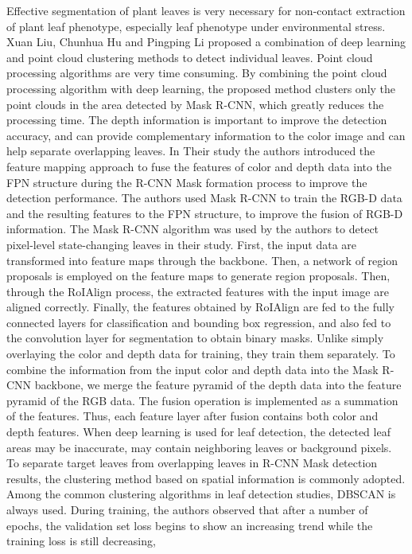 Effective segmentation of plant leaves is very necessary for non-contact extraction of plant leaf phenotype, especially leaf phenotype under environmental stress.
Xuan Liu, Chunhua Hu and Pingping Li\cite{LIU2020105753} proposed a combination of deep learning and point cloud clustering methods to detect individual leaves. Point cloud processing algorithms are very time
consuming. By combining the point cloud processing algorithm with deep learning, the proposed method clusters only the point clouds in the area detected by Mask R-CNN\cite{he2017mask},
which greatly reduces the processing time. The depth information is important to improve the detection accuracy, and can provide complementary information to the color
image and can help separate overlapping leaves. In Their study the authors introduced the feature mapping approach to fuse the features of color and depth data into the FPN\cite{lin2017feature}
structure during the R-CNN Mask formation process to improve the detection performance. The authors used Mask R-CNN to train the RGB-D data and the resulting features
to the FPN structure, to improve the fusion of RGB-D information. The Mask R-CNN algorithm was used by the authors to detect pixel-level state-changing leaves in their
study. First, the input data are transformed into feature maps through the backbone. Then, a network of region proposals is employed on the feature maps to generate
region proposals. Then, through the RoIAlign process, the extracted features with the input image are aligned correctly. Finally, the features obtained by RoIAlign are
fed to the fully connected layers for classification and bounding box regression, and also fed to the convolution layer for segmentation to obtain binary masks.
Unlike simply overlaying the color and depth data for training, they train them separately. To combine the information from the input color and depth data into
the Mask R-CNN backbone, we merge the feature pyramid of the depth data into the feature pyramid of the RGB data. The fusion operation is implemented as a summation
of the features. Thus, each feature layer after fusion contains both color and depth features. When deep learning is used for leaf detection, the detected leaf areas
may be inaccurate, may contain neighboring leaves or background pixels. To separate target leaves from overlapping leaves in R-CNN Mask detection results, the clustering
method based on spatial information is commonly adopted. Among the common clustering algorithms in leaf detection studies, DBSCAN is always used.
During training, the authors observed that after a number of epochs, the validation set loss begins to show an increasing trend while the training loss is still decreasing,
